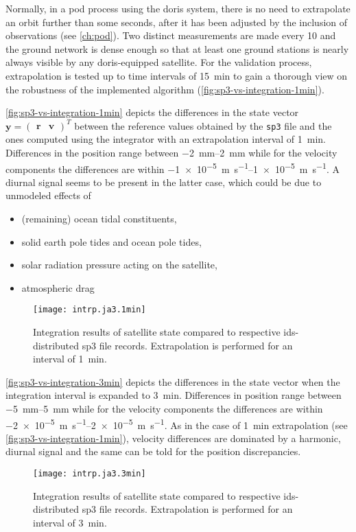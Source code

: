 Normally, in a \gls{pod} process using the \gls{doris} system, there is no need to 
extrapolate an orbit further than some seconds, after it has been adjusted by the 
inclusion of observations (see \autoref{ch:pod}). Two distinct measurements are made 
every \SI{10}{\sec} and the ground network is dense enough so that at least one 
ground stations is nearly always visible by any \gls{doris}-equipped satellite. 
For the validation process, extrapolation is tested up to time intervals of 
\SI{15}{\minute} to gain a thorough view on the robustness of the implemented 
algorithm (\autoref{fig:sp3-vs-integration-1min}).

\autoref{fig:sp3-vs-integration-1min} depicts the differences in the state vector 
$\bm{y} = \begin{pmatrix}\bm{r} & \bm{v}\end{pmatrix}^T$ between the reference values 
obtained by the \texttt{sp3} file and the ones computed using the integrator with 
an extrapolation interval of \SI{1}{\minute}. Differences in the position range 
between \qtyrange{-2}{2}{\milli\metre} while for the velocity components the 
differences are within \qtyrange{-1e-5}{1e-5}{\meter\per\second}. A diurnal 
signal seems to be present in the latter case, which could be due to unmodeled 
effects of \begin{itemize}
  \item (remaining) ocean tidal constituents, 
  \item solid earth pole tides and ocean pole tides,
  \item solar radiation pressure acting on the satellite,
  \item atmospheric drag
\end{itemize}
\begin{figure}
  \centering
  \texttt{[image: intrp.ja3.1min]}
  \caption{Integration results of satellite state compared to respective 
    \gls{ids}-distributed sp3 file records. Extrapolation is performed for an 
    interval of \SI{1}{\minute}.}
  \label{fig:sp3-vs-integration-1min}
\end{figure}

\autoref{fig:sp3-vs-integration-3min} depicts the differences in the state vector 
when the integration interval is expanded to \SI{3}{\minute}. Differences in 
position range between \qtyrange{-5}{5}{\milli\metre} while for the velocity 
components the differences are within \qtyrange{-2e-5}{2e-5}{\meter\per\second}. As in the 
case of \SI{1}{\minute} extrapolation (see \autoref{fig:sp3-vs-integration-1min}), 
velocity differences are dominated by a harmonic, diurnal signal and the same can 
be told for the position discrepancies.
\begin{figure}
  \centering
  \texttt{[image: intrp.ja3.3min]}
  \caption{Integration results of satellite state compared to respective 
    \gls{ids}-distributed sp3 file records. Extrapolation is performed for an 
    interval of \SI{3}{\minute}.}
  \label{fig:sp3-vs-integration-3min}
\end{figure}

